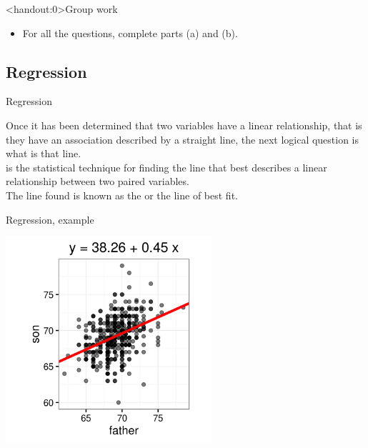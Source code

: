 \documentclass[xcolor=table]{beamer}
\begin{document}
\begin{frame}<handout:0>{Group work}
\begin{block}{}
\large
\begin{itemize}
\item For all the questions, complete parts (a) and (b).
\end{itemize}
\end{block}
\end{frame}


\subsection{Regression}

\begin{frame}{Regression}
\begin{block}{}
\large
Once it has been determined that two variables have a linear relationship, that is they have an association described by a straight line, the next logical question is what is that line.\\
\pause\medskip
{} is the statistical technique for finding the line that best describes a linear relationship between two paired variables.\\
\pause\medskip
The line found is known as the  or the line of best fit.
\end{block}
\end{frame}

\begin{frame}{Regression, example}

\medskip
{\centering
\includegraphics[width=3in]{../images/ch10_reg_galton}
\par}

\end{frame}
\end{document}

